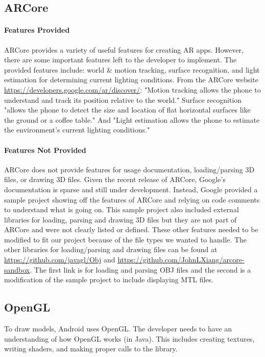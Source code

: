 
\subsection{ARCore}
    \paragraph{Features Provided}

    ARCore provides a variety of useful features for creating AR apps. However, there are some important features left to the developer to implement. The provided features include: world \& motion tracking, surface recognition, and light estimation for determining current lighting conditions. From the ARCore website \url{https://developers.google.com/ar/discover/}: "Motion tracking allows the phone to understand and track its position relative to the world." Surface recognition "allows the phone to detect the size and location of flat horizontal surfaces like the ground or a coffee table." And "Light estimation allows the phone to estimate the environment's current lighting conditions."

    \paragraph{Features Not Provided}

    ARCore does not provide features for usage documentation, loading/parsing 3D files, or drawing 3D files. Given the recent release of ARCore, Google's documentation is sparse and still under development. Instead, Google provided a sample project showing off the features of ARCore and relying on code comments to understand what is going on. This sample project also included external libraries for loading, parsing and drawing 3D files but they are not part of ARCore and were not clearly listed or defined. These other features needed to be modified to fit our project because of the file types we wanted to handle. The other libraries for loading/parsing and drawing files can be found at \url{https://github.com/javagl/Obj} and \url{https://github.com/JohnLXiang/arcore-sandbox}. The first link is for loading and parsing OBJ files and the second is a modification of the sample project to include displaying MTL files.

\subsection{OpenGL}
    To draw models, Android uses OpenGL. The developer needs to have an understanding of how OpenGL works (in Java). This includes creating textures, writing shaders, and making proper calls to the library.

